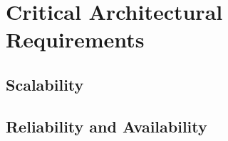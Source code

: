 \documentclass[a4paper,12pt,titlepage]{article}
\begin{document}


\tableofcontents
\newpage

%

\section{Critical Architectural Requirements}




\subsection{Scalability}


\subsection{Reliability and Availability}









\end{document}
